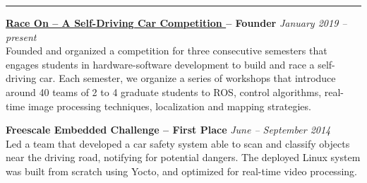 \documentclass[11pt]{res}
\begin{document}
\begin{resume}
\vspace{-8mm}
\begin{center}
    \rule{7.5in}{0.4pt}
\end{center}
\vspace{-6mm}

\textbf{\href{http://raceon.io/}{Race On -- A Self-Driving Car Competition \scriptsize {}} -- Founder}  
\hfill        \textit{\small January 2019 -- present} \\
Founded and organized a competition for three consecutive semesters that engages students in hardware-software development to build and race a self-driving car. Each semester, we organize a series of workshops that introduce around 40 teams of 2 to 4 graduate students to ROS, control algorithms, real-time image processing techniques, localization and mapping strategies.


\textbf{Freescale Embedded Challenge -- First Place} \hfill \textit{\small June -- September 2014} \\
Led a team that developed a car safety system able to scan and classify objects near the driving road, notifying for potential dangers. The deployed Linux system was built from scratch using Yocto, and optimized for real-time video processing.



\end{resume} 
\end{document}
